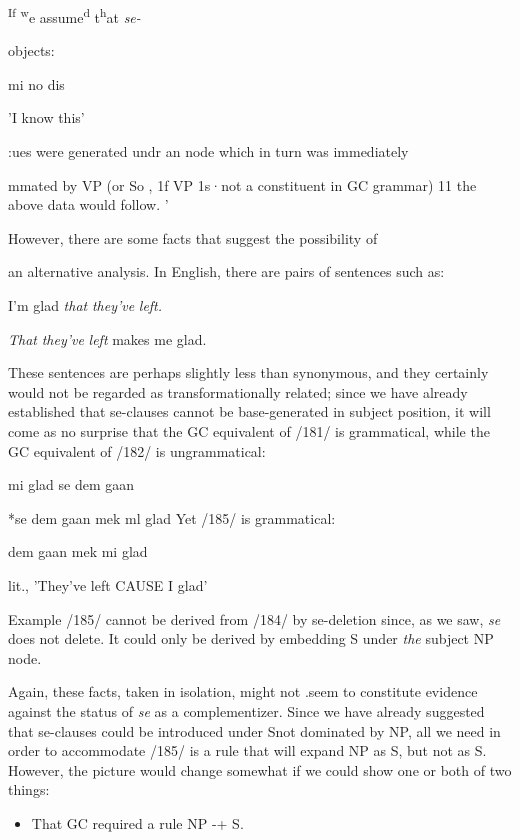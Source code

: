 \textsuperscript{If} \textsuperscript{w}e assume\textsuperscript{d} t\textsuperscript{h}at \textit{se-}

objects:

\ea\label{ex:169}
 mi no dis
\glt
\z

'I know this'

:ues were generated undr an node which in turn was immediately

mmated by VP (or So , 1f VP 1s·not a constituent in GC grammar) 11 the above data would follow. '

However, there are some facts that suggest the possibility of


an alternative analysis. In English, there are pairs of sentences such as:

\ea\label{ex:181}
 I'm glad \textit{that} \textit{they've} \textit{left.}
\glt
\z

\ea\label{ex:182}
 \textit{That} \textit{they've} \textit{left} makes me glad.
\glt
\z

These sentences are perhaps slightly less than synonymous, and they certainly would not be regarded as transformationally related; since we have already established that se-clauses cannot be base-generated in subject position, it will come as no surprise that the GC equiva\-lent of /181/ is grammatical, while the GC equivalent of /182/ is ungrammatical:

\ea\label{ex:183}
 mi glad se dem gaan
\glt
\z

\ea\label{ex:184}
 *se dem gaan mek ml glad Yet /185/ is grammatical:
\glt
\z

\ea\label{ex:185}
 dem gaan mek mi glad
\glt
\z

lit., 'They've left CAUSE I glad'

Example /185/ cannot be derived from /184/ by se-deletion since, as we saw, \textit{se} does not delete. It could only be derived by embedding S under \textit{the} subject NP node.

Again, these facts, taken in isolation, might not .seem to con\-stitute evidence against the status of \textit{se} as a complementizer. Since we have already suggested that se-clauses could be introduced under Snot dominated by NP, all we need in order to accommodate /185/ is a rule that will expand NP as S, but not as S. However, the picture would change somewhat if we could show one or both of two things:

\begin{itemize}
\item That GC required a rule NP {}-+ S.
\end{itemize}

